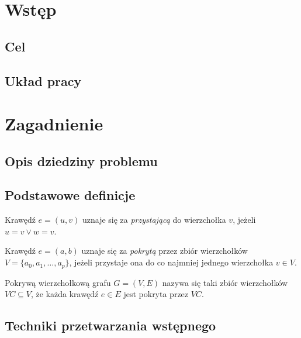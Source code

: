 \chapter{Wstęp}\label{Chapter_Wstep}

\section{Cel}\label{Section_Aim}

\section{Układ pracy}\label{Section_Layout}

\chapter{Zagadnienie }\label{Chapter_Domain}
\section{Opis dziedziny problemu}\label{Section_Problematyka}

\section{Podstawowe definicje}\label{Section_Definicje}

\begin{lemma}
  Krawędź $e=(u,v)$ uznaje się za \emph{przystającą} do wierzchołka $v$,
  jeżeli $u=v \lor w=v$.
\end{lemma}

\begin{lemma}
  Krawędź $e=(a,b)$ uznaje się za \emph{pokrytą} przez zbiór wierzchołków \\
  $V=\{a_0, a_1, \ldots, a_p\}$, jeżeli przystaje ona do co najmniej jednego
  wierzchołka $v \in V$.
\end{lemma}

\begin{lemma}
  Pokrywą wierzchołkową grafu $G=(V,E)$ nazywa się taki zbiór wierzchołków
  $VC \subseteq V$, że każda krawędź $e \in E$ jest pokryta przez $VC$.
\end{lemma}

\section{Techniki przetwarzania wstępnego}\label{Section_preprocessing}

